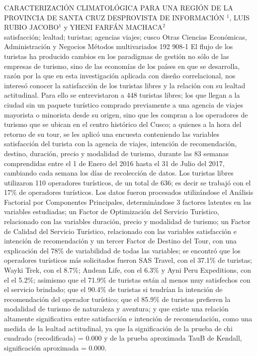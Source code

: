 \A
{CARACTERIZACIÓN CLIMATOLÓGICA PARA UNA REGIÓN DE LA PROVINCIA DE SANTA CRUZ DESPROVISTA DE INFORMACIÓN}
{$^1$, LUIS RUBIO JACOBO$^1$ y YHENI FARFÁN MACHACA$^2$}
{
\\}
{satisfacción; lealtad; turistas; agencias viajes; cusco} 
 {Otras Ciencias Económicas, Administración y Negocios} 
 {Métodos multivariados} 
 {192} 
 {908-1}
{El flujo de los turistas ha producido cambios en los paradigmas de gestión no sólo de las empresas de turismo, sino de las economías de los países en que se desarrolla, razón por la que en esta investigación aplicada con diseño correlacional, nos interesó conocer la satisfacción de los turistas libres y la relación con su lealtad actitudinal. Para ello se entrevistaron a 448 turistas libres; los que llegan a la ciudad sin un paquete turístico comprado previamente a una agencia de viajes mayorista o  minorista desde su origen, sino que les compran a los operadores de turismo que se ubican en el centro histórico del Cusco; a quienes a la hora del retorno de su tour, se les aplicó una encuesta conteniendo las variables satisfacción del turista con la agencia de viajes, intención de recomendación, destino, duración, precio y modalidad de turismo, durante las 83 semanas comprendidas entre el 1 de Enero del 2016 hasta el 31 de Julio del 2017, cambiando cada semana los días de recolección de datos. Los turistas libres utilizaron 110 operadores turísticos, de un total de 636; es decir se trabajó con el 17\% de operadores turísticos. Los datos fueron procesados utilizándose el Análisis Factorial por Componentes Principales, determinándose 3 factores latentes en las variables estudiadas; un Factor de Optimización del Servicio Turístico, relacionado con las variables duración, precio y modalidad de turismo; un Factor de Calidad del Servicio Turístico, relacionado con las variables satisfacción e intención de recomendación  y un tercer Factor de Destino del Tour, con una explicación del 78\% de variabilidad de todas las variables; se encontró que los operadores turísticos más solicitados fueron SAS Travel, con el 37.1\% de turistas; Wayki Trek, con el 8.7\%; Andean Life, con el 6.3\% y Ayni Peru Expeditions, con el  el 5.2\%;  asimismo que  el 71.9\% de turistas están al menos muy satisfechos con el servicio brindado;  que el 90.4\% de turistas si tendrían la intención de recomendación del operador turístico; que el 85.9\% de turistas prefieren la modalidad de turismo de naturaleza y aventura; y que existe una relación altamente significativa entre satisfacción e intención de recomendación, como una medida de la lealtad actitudinal, ya que la significación de la prueba de chi cuadrado (recodificada) = 0.000 y de la prueba aproximada TauB de Kendall, significación aproximada = 0.000.}
